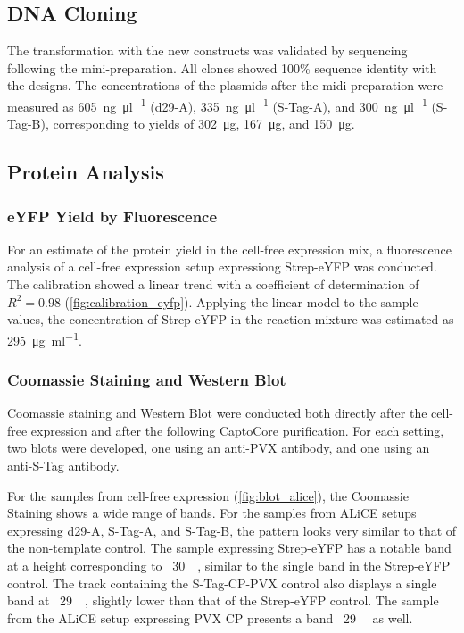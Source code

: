 \subsection{DNA Cloning}
The transformation with the new constructs was validated by sequencing following the mini-preparation. All clones showed 100\% sequence identity with the designs. The concentrations of the plasmids after the midi preparation were measured as \SI{605}{\nano\gram\per\micro\litre} (d29-A), \SI{335}{\nano\gram\per\micro\litre} (S-Tag-A), and \SI{300}{\nano\gram\per\micro\litre} (S-Tag-B), corresponding to yields of \SI{302}{\micro\gram}, \SI{167}{\micro\gram}, and \SI{150}{\micro\gram}.

\subsection{Protein Analysis}
\subsubsection{eYFP Yield by Fluorescence}
For an estimate of the protein yield in the cell-free expression mix, a fluorescence analysis of a cell-free expression setup expressiong Strep-eYFP was conducted. The calibration showed a linear trend with a coefficient of determination of $R^2 = 0.98$ (\autoref{fig:calibration_eyfp}). Applying the linear model to the sample values, the concentration of Strep-eYFP in the reaction mixture was estimated as \SI{295}{\micro\gram\per\milli\litre}.

\subsubsection{Coomassie Staining and Western Blot} 
Coomassie staining and Western Blot were conducted both directly after the cell-free expression and after the following CaptoCore purification. For each setting, two blots were developed, one using an anti-PVX antibody, and one using an anti-S-Tag antibody. 

For the samples from cell-free expression (\autoref{fig:blot_alice}), the Coomassie Staining shows a wide range of bands. For the samples from ALiCE setups expressing d29-A, S-Tag-A, and S-Tag-B, the pattern looks very similar to that of the non-template control. The sample expressing Strep-eYFP has a notable band at a height corresponding to ~\SI{30}{\kilo\Dalton}, similar to the single band in the Strep-eYFP control. The track containing the S-Tag-CP-PVX control also displays a single band at ~\SI{29}{\kilo\Dalton}, slightly lower than that of the Strep-eYFP control. The sample from the ALiCE setup expressing PVX CP presents a band ~\SI{29}{\kilo\Dalton} as well. 

